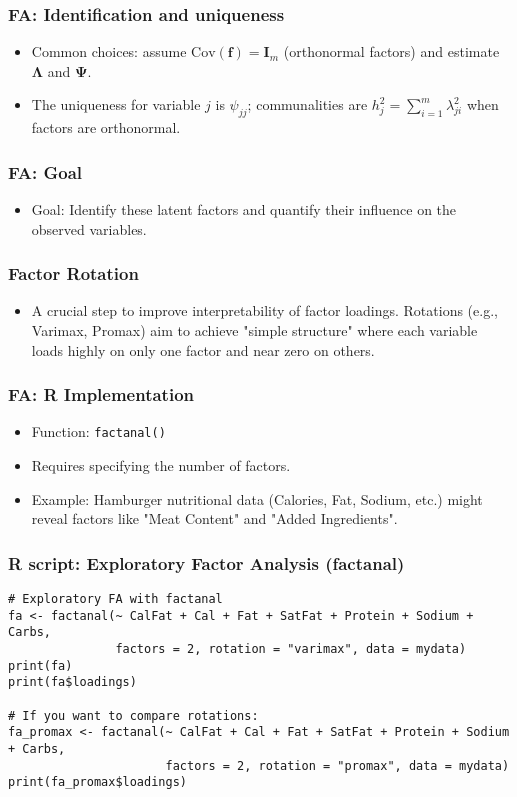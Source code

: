 \documentclass{beamer}
\newcommand{\code}[1]{\texttt{#1}}
\begin{document}
\begin{frame}
    \frametitle{FA: Identification and uniqueness}
    \begin{itemize}
        \item Common choices: assume $\mathrm{Cov}(\mathbf{f})=\mathbf{I}_m$ (orthonormal factors) and estimate $\mathbf{\Lambda}$ and $\boldsymbol{\Psi}$.
        \item The uniqueness for variable $j$ is $\psi_{jj}$; communalities are $h_j^2=\sum_{i=1}^m\lambda_{ji}^2$ when factors are orthonormal.
    \end{itemize}
\end{frame}

\begin{frame}
    \frametitle{FA: Goal}
    \begin{itemize}
        \item Goal: Identify these latent factors and quantify their influence on the observed variables.
    \end{itemize}
\end{frame}

\begin{frame}
    \frametitle{Factor Rotation}
    \begin{itemize}
        \item A crucial step to improve interpretability of factor loadings. Rotations (e.g., Varimax, Promax) aim to achieve "simple structure" where each variable loads highly on only one factor and near zero on others.
    \end{itemize}
\end{frame}

\begin{frame}
    \frametitle{FA: R Implementation}
    \begin{itemize}
        \item Function: \code{factanal()}
        \item Requires specifying the number of factors.
        \item Example: Hamburger nutritional data (Calories, Fat, Sodium, etc.) might reveal factors like "Meat Content" and "Added Ingredients".
    \end{itemize}
\end{frame}

\begin{frame}[fragile]
    \frametitle{R script: Exploratory Factor Analysis (factanal)}
    \begin{verbatim}
# Exploratory FA with factanal
fa <- factanal(~ CalFat + Cal + Fat + SatFat + Protein + Sodium + Carbs,
               factors = 2, rotation = "varimax", data = mydata)
print(fa)
print(fa$loadings)

# If you want to compare rotations:
fa_promax <- factanal(~ CalFat + Cal + Fat + SatFat + Protein + Sodium + Carbs,
                      factors = 2, rotation = "promax", data = mydata)
print(fa_promax$loadings)
    \end{verbatim}
\end{frame}
\end{document}

